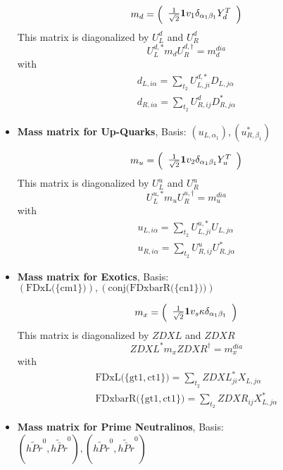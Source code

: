 \begin{itemize}
\begin{equation} 
m_{d} = \left( 
\begin{array}{c}
\frac{1}{\sqrt{2}} {\bf 1} v_1 \delta_{{\alpha_1} {\beta_1}} Y_{d}^{T} \end{array} 
\right) 
 \end{equation} 
This matrix is diagonalized by \(U^d_L\) and \(U^d_R\) 
\begin{equation} 
U^{d,*}_L m_{d} U_{R}^{d,\dagger} = m^{dia}_{d} 
\end{equation} 
with 
\begin{align} 
d_{L,{i \alpha}} = \sum_{t_2}U^{d,*}_{L,{j i}}D_{L,{j \alpha}}\\ 
d_{R,{i \alpha}} = \sum_{t_2}U_{R,{i j}}^{d}D^*_{R,{j \alpha}}
\end{align} 
\item {\bf Mass matrix for Up-Quarks}, Basis: \( \left(u_{L,{{\alpha_1}}}\right), \left(u^*_{R,{{\beta_1}}}\right) \) 
 
\begin{equation} 
m_{u} = \left( 
\begin{array}{c}
\frac{1}{\sqrt{2}} {\bf 1} v_2 \delta_{{\alpha_1} {\beta_1}} Y_{u}^{T} \end{array} 
\right) 
 \end{equation} 
This matrix is diagonalized by \(U^u_L\) and \(U^u_R\) 
\begin{equation} 
U^{u,*}_L m_{u} U_{R}^{u,\dagger} = m^{dia}_{u} 
\end{equation} 
with 
\begin{align} 
u_{L,{i \alpha}} = \sum_{t_2}U^{u,*}_{L,{j i}}U_{L,{j \alpha}}\\ 
u_{R,{i \alpha}} = \sum_{t_2}U_{R,{i j}}^{u}U^*_{R,{j \alpha}}
\end{align} 
\item {\bf Mass matrix for Exotics}, Basis: \( \left(\text{FDxL}\Big(\{\text{cm1}\}\Big)\right), \left(\text{conj}\Big(\text{FDxbarR}\Big(\{\text{cn1}\}\Big)\Big)\right) \) 
 
\begin{equation} 
m_{x} = \left( 
\begin{array}{c}
\frac{1}{\sqrt{2}} {\bf 1} v_s \kappa \delta_{{\alpha_1} {\beta_1}} \end{array} 
\right) 
 \end{equation} 
This matrix is diagonalized by \(ZDXL\) and \(ZDXR\) 
\begin{equation} 
ZDXL^* m_{x} ZDXR^{\dagger} = m^{dia}_{x} 
\end{equation} 
with 
\begin{align} 
\text{FDxL}\Big(\{\text{gt1},\text{ct1}\}\Big) = \sum_{t_2}ZDXL^*_{j i}X_{L,{j \alpha}}\\ 
\text{FDxbarR}\Big(\{\text{gt1},\text{ct1}\}\Big) = \sum_{t_2}ZDXR_{{i j}}X^*_{L,{j \alpha}}
\end{align} 
\item {\bf Mass matrix for Prime Neutralinos}, Basis: 
\( \left(\tilde{hPr}^{0}, \tilde{\bar{hPr}}^{0}\right), \left(\tilde{hPr}^{0}, \tilde{\bar{hPr}}^{0}\right) \) 
 

\end{itemize}

